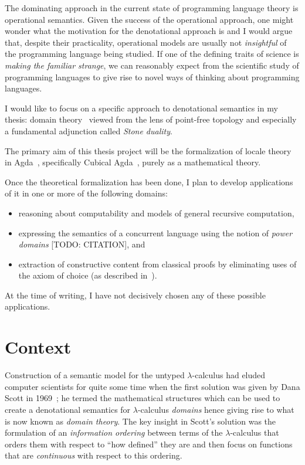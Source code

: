 \documentclass{article}
\begin{document}
The dominating approach in the current state of programming language theory is operational
semantics. Given the success of the operational approach, one might wonder what the
motivation for the denotational approach is and I would argue that, despite their
practicality, operational models are usually not \emph{insightful} of the programming
language being studied. If one of the defining traits of science is \emph{making the
  familiar strange}, we can reasonably expect from the scientific study of programming
languages to give rise to novel ways of thinking about programming languages.

I would like to focus on a specific approach to denotational semantics in my thesis:
domain theory~\cite{scott:1969} viewed from the lens of point-free topology and especially
a fundamental adjunction called \emph{Stone duality}.

The primary aim of this thesis project will be the formalization of locale
theory~\cite{johnstone:1982} in Agda~\cite{norell:2008}, specifically Cubical
Agda~\cite{cubicalagda}, purely as a mathematical theory.

Once the theoretical formalization has been done, I plan to develop applications of it in
one or more of the following domains:
\begin{itemize}
  \item reasoning about computability and models of general recursive computation,
  \item expressing the semantics of a concurrent language using the notion of
    \emph{power domains} [TODO: CITATION], and
  \item extraction of constructive content from classical proofs by eliminating uses of
    the axiom of choice (as described in~\cite{coquand:1997}).
\end{itemize}
At the time of writing, I have not decisively chosen any of these possible applications.

\section{Context}

Construction of a semantic model for the untyped $\lambda$-calculus had eluded computer
scientists for quite some time when the first solution was given by Dana Scott in
1969~\cite{scott:1969}; he termed the mathematical structures which can be used to create
a denotational semantics for $\lambda$-calculus \emph{domains} hence giving rise to what is now
known as \emph{domain theory}. The key insight in Scott's solution was the formulation of
an \emph{information ordering} between terms of the $\lambda$-calculus that orders them with
respect to ``how defined'' they are and then focus on functions that are \emph{continuous}
with respect to this ordering.
\end{document}
